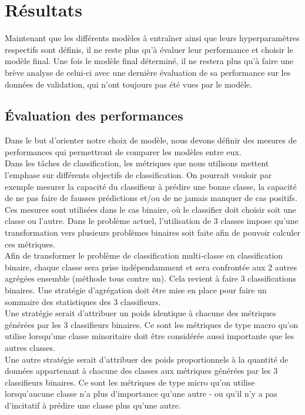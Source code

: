 \section{Résultats}
Maintenant que les différents modèles à entraîner ainsi que leurs hyperparamètres respectifs sont définis, il ne reste plus qu'à évaluer leur performance et choisir le modèle final. Une fois le modèle final déterminé, il ne restera plus qu'à faire une brève analyse de celui-ci avec une dernière évaluation de sa performance sur les données de validation, qui n'ont toujours pas été vues par le modèle.  


\subsection{Évaluation des performances}
Dans le but d'orienter notre choix de modèle, nous devons définir des mesures de performances qui permettront de comparer les modèles entre eux. \\

Dans les tâches de classification, les métriques que nous utilisons mettent l'emphase sur différents objectifs de classification. On pourrait vouloir par exemple mesurer la capacité du classifieur à prédire une bonne classe, la capacité de ne pas faire de fausses prédictions et/ou de ne jamais manquer de cas positifs. Ces mesures sont utilisées dans le cas binaire, où le classifier doit choisir soit une classe ou l'autre. Dans le  problème actuel, l'utilisation de 3 classes impose qu'une transformation vers plusieurs problèmes binaires soit faite afin de pouvoir calculer ces métriques. \\

Afin de transformer le problème de classification multi-classe en classification binaire, chaque classe sera prise indépendamment et sera confrontée aux 2 autres agrégées ensemble (méthode tous contre un). Cela revient à faire 3 classifications binaires. Une stratégie d'agrégation doit être mise en place pour faire un sommaire des statistiques des 3 classifieurs. \\ Une stratégie serait d'attribuer un poids identique à chacune des métriques générées par les 3 classifieurs binaires. Ce sont les métriques de type macro qu'on utilise lorsqu'une classe minoritaire doit être considérée aussi importante que les autres classes. \\ Une autre stratégie serait d'attribuer des poids proportionnels à la quantité de données appartenant à chacune des classes aux métriques générées par les 3 classifieurs binaires. Ce sont les métriques de type micro qu'on utilise lorsqu'aucune classe n'a plus d'importance qu'une autre - ou qu'il n'y a pas d'incitatif à prédire une classe plus qu'une autre. \\

